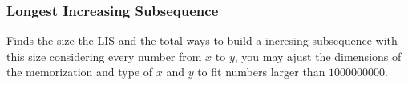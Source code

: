 \subsubsection{Longest Increasing Subsequence}

Finds the size the LIS and the total ways to build a incresing subsequence with this size considering every number from $x$ to $y$, you may ajust the dimensions of the memorization and type of $x$ and $y$ to fit numbers larger than $1000000000$.
